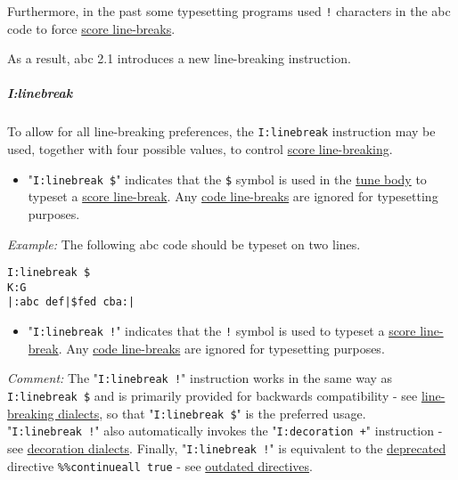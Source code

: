 Furthermore, in the past some typesetting programs used \texttt{!}
characters in the abc code to force
\protect\hyperlink{score_line-break_definition}{score line-breaks}.

As a result, abc 2.1 introduces a new line-breaking instruction.

\subparagraph{I:linebreak}\label{ilinebreak}

To allow for all line-breaking preferences, the \texttt{I:linebreak}
instruction may be used, together with four possible values, to control
\protect\hyperlink{score_line-break_definition}{score line-breaking}.

\begin{itemize}
\item
  "\texttt{I:linebreak\ \$}" indicates that the \texttt{\$} symbol is
  used in the \protect\hyperlink{tune_body_definition}{tune body} to
  typeset a \protect\hyperlink{score_line-break_definition}{score
  line-break}. Any \protect\hyperlink{code_line-break_definition}{code
  line-breaks} are ignored for typesetting purposes.
\end{itemize}

\emph{Example:} The following abc code should be typeset on two lines.

\begin{verbatim}
I:linebreak $
K:G
|:abc def|$fed cba:|
\end{verbatim}

\begin{itemize}
\item
  "\texttt{I:linebreak\ !}" indicates that the \texttt{!} symbol is used
  to typeset a \protect\hyperlink{score_line-break_definition}{score
  line-break}. Any \protect\hyperlink{code_line-break_definition}{code
  line-breaks} are ignored for typesetting purposes.
\end{itemize}

\emph{Comment:} The "\texttt{I:linebreak\ !}" instruction works in the
same way as \texttt{I:linebreak\ \$} and is primarily provided for
backwards compatibility - see
\protect\hyperlink{line-breaking_dialects}{line-breaking dialects}, so
that "\texttt{I:linebreak\ \$}" is the preferred usage.
"\texttt{I:linebreak\ !}" also automatically invokes the
"\texttt{I:decoration\ +}" instruction - see
\protect\hyperlink{decoration_dialects}{decoration dialects}. Finally,
"\texttt{I:linebreak\ !}" is equivalent to the
\protect\hyperlink{outdated_syntax}{deprecated} directive
\texttt{\%\%continueall\ true} - see
\protect\hyperlink{outdated_directives}{outdated directives}.

